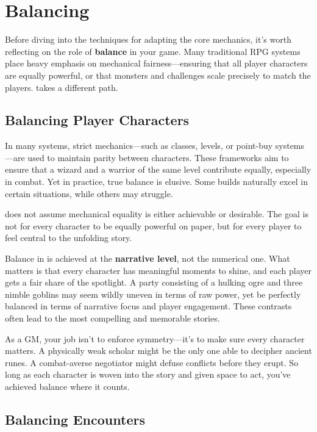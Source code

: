 \section{Balancing}

Before diving into the techniques for adapting the core mechanics, it’s worth reflecting on the role of \textbf{balance} in your game. Many traditional RPG systems place heavy emphasis on mechanical fairness—ensuring that all player characters are equally powerful, or that monsters and challenges scale precisely to match the players. \wyrd takes a different path.

\subsection{Balancing Player Characters}

In many systems, strict mechanics—such as classes, levels, or point-buy systems—are used to maintain parity between characters. These frameworks aim to ensure that a wizard and a warrior of the same level contribute equally, especially in combat. Yet in practice, true balance is elusive. Some builds naturally excel in certain situations, while others may struggle.

\wyrd does not assume mechanical equality is either achievable or desirable. The goal is not for every character to be equally powerful on paper, but for every player to feel central to the unfolding story.

Balance in \wyrd is achieved at the \textbf{narrative level}, not the numerical one. What matters is that every character has meaningful moments to shine, and each player gets a fair share of the spotlight. A party consisting of a hulking ogre and three nimble goblins may seem wildly uneven in terms of raw power, yet be perfectly balanced in terms of narrative focus and player engagement. These contrasts often lead to the most compelling and memorable stories.

As a GM, your job isn’t to enforce symmetry—it’s to make sure every character matters. A physically weak scholar might be the only one able to decipher ancient runes. A combat-averse negotiator might defuse conflicts before they erupt. So long as each character is woven into the story and given space to act, you’ve achieved balance where it counts.

\subsection{Balancing Encounters}

